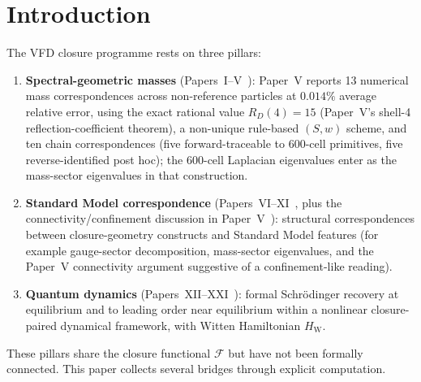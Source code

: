 \documentclass[12pt]{article}
\newcommand{\Fcal}{\mathcal{F}}
\newcommand{\HW}{H_{\mathrm{W}}}
\begin{document}
\begin{abstract}
Nineteen scripts accompany the paper; most reproduce the listed computations, while some are exploratory or incomplete (see Section~\ref{sec:discussion}). The paper does not claim to derive the Standard Model, the fine-structure constant, the Weinberg angle, or the generation hierarchy from first principles; it presents a coordinated set of computed relations and structural correspondences around a single closure functional on the 600-cell, with gravity and several quantitative reductions remaining as separate programmes.
\end{abstract}

\section{Introduction}\label{sec:intro}

The VFD closure programme rests on three pillars:
\begin{enumerate}
    \item \textbf{Spectral-geometric masses} (Papers~I--V~\citep{SmartI, SmartV}): Paper~V reports 13 numerical mass correspondences across non-reference particles at $0.014\%$ average relative error, using the exact rational value $R_D(4) = 15$ (Paper~V's shell-4 reflection-coefficient theorem), a non-unique rule-based $(S,w)$ scheme, and ten chain correspondences (five forward-traceable to 600-cell primitives, five reverse-identified post hoc); the 600-cell Laplacian eigenvalues enter as the mass-sector eigenvalues in that construction.
    \item \textbf{Standard Model correspondence} (Papers~VI--XI~\citep{SmartVI, SmartXI}, plus the connectivity/confinement discussion in Paper~V~\citep{SmartV}): structural correspondences between closure-geometry constructs and Standard Model features (for example gauge-sector decomposition, mass-sector eigenvalues, and the Paper~V connectivity argument suggestive of a confinement-like reading).
    \item \textbf{Quantum dynamics} (Papers~XII--XXI~\citep{SmartXIV, SmartXVII, SmartXVIII, SmartXX, SmartXXI}): formal Schr\"odinger recovery at equilibrium and to leading order near equilibrium within a nonlinear closure-paired dynamical framework, with Witten Hamiltonian $\HW$.
\end{enumerate}

These pillars share the closure functional $\Fcal$ but have not been formally connected. This paper collects several bridges through explicit computation.
\end{document}
